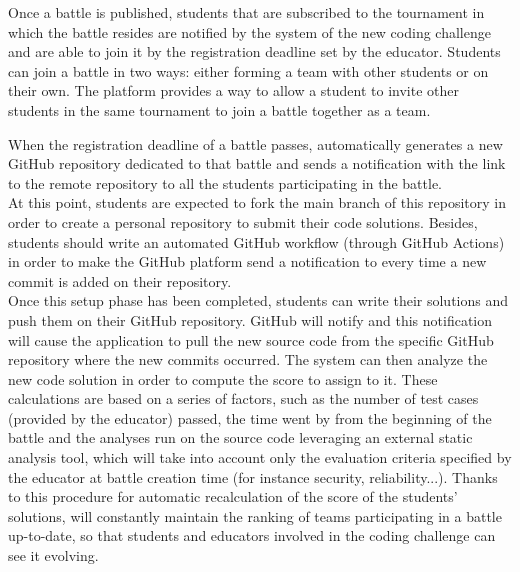 	Once a battle is published, students that are subscribed to the tournament in which the battle resides are notified by the system of the new coding challenge and are able to join it by the registration deadline set by the educator.
	Students can join a battle in two ways: either forming a team with other students or on their own. The platform provides a way to allow a student to invite other students in the same tournament to join a battle together as a team.
	
	When the registration deadline of a battle passes, \app automatically generates a new GitHub repository dedicated to that battle and sends a notification with the link to the remote repository to all the students participating in the battle.\\
	At this point, students are expected to fork the main branch of this repository in order to create a personal repository to submit their code solutions. Besides, students should write an automated GitHub workflow (through GitHub Actions) in order to make the GitHub platform send a notification to \app every time a new commit is added on their repository. \\
	Once this setup phase has been completed, students can write their solutions and push them on their GitHub repository. GitHub will notify \app and this notification will cause the \app application to pull the new source code from the specific GitHub repository where the new commits occurred. The system can then analyze the new code solution in order to compute the score to assign to it. These calculations are based on a series of factors, such as the number of test cases (provided by the educator) passed, the time went by from the beginning of the battle and the analyses run on the source code leveraging an external static analysis tool, which will take into account only the evaluation criteria specified by the educator at battle creation time (for instance security, reliability...).
	Thanks to this procedure for automatic recalculation of the score of the students' solutions, \app will constantly maintain the ranking of teams participating in a battle up-to-date, so that students and educators involved in the coding challenge can see it evolving.
	
